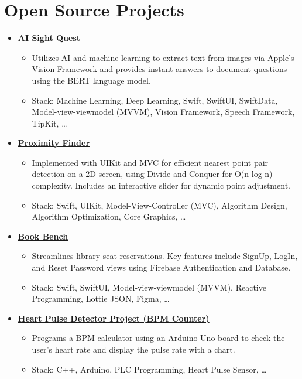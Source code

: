 \documentclass[letter,12pt]{article}
\newcommand{\customsquare}{\raisebox{0.25ex}{\scalebox{0.45}{$\blacksquare$}}}
\begin{document}
\pagebreak

\section*{Open Source Projects}
\begin{itemize}[label={\customsquare}]
    \item \href{https://github.com/nsswifter/AISightQuest}{\underline{\textbf{AI Sight Quest}}}
    \begin{itemize}
        \item Utilizes AI and machine learning to extract text from images via Apple's \mbox{Vision} Framework and provides instant answers to document questions using the BERT language model.
        \item Stack: Machine Learning, Deep Learning, Swift, SwiftUI, SwiftData, Model-view-viewmodel (MVVM), \mbox{Vision} Framework, Speech Framework, TipKit, …
    \end{itemize}

    \item \href{https://github.com/nsswifter/ProximityFinder}{\underline{\textbf{Proximity Finder}}}
    \begin{itemize}
        \item Implemented with UIKit and MVC for efficient nearest point pair detection on a 2D screen, using Divide and Conquer for O(n log n) complexity. Includes an interactive slider for dynamic point adjustment.
        \item Stack: Swift, UIKit, Model-View-Controller (MVC), Algorithm Design, Algorithm Optimization, Core Graphics, … 
    \end{itemize}

    \item \href{https://github.com/nsswifter/BookBench}{\underline{\textbf{Book Bench}}}
    \begin{itemize}
        \item Streamlines library seat reservations. Key features include SignUp, LogIn, and Reset Password views using Firebase Authentication and Database.
        \item Stack: Swift, SwiftUI, Model-view-viewmodel (MVVM), Reactive Programming, Lottie JSON, Figma, …
    \end{itemize}

    \item \href{https://github.com/nsswifter/Heart-Pulse-Detector-Using-Arduino}{\underline{\textbf{Heart Pulse Detector Project (BPM Counter)}}}
    \begin{itemize}
        \item Programs a BPM calculator using an Arduino Uno board to check the user's heart rate and display the pulse rate with a chart.
        \item Stack: C++, Arduino, PLC Programming, Heart Pulse Sensor, …
    \end{itemize}


\end{itemize}
\end{document}
